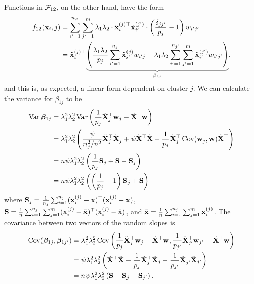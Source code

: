 Functions in ${\mathcal F}_{12}$, on the other hand, have the form
\begin{align*}
  f_{12}(\bx_i, j)
  &= \sum_{i'=1}^{n_{j'}}\sum_{j'=1}^m \lambda_1\lambda_2 \cdot \tilde \bx_i^{(j)\top} \tilde \bx_{i'}^{(j')} \cdot \left( \frac{\delta_{jj'}}{p_j} - 1 \right)  w_{i'j'} \\
  &=  \tilde \bx_i^{(j)\top}   
  {\color{gray}
  \underbrace{\color{black}
  \left( \frac{\lambda_1\lambda_2}{p_j} \sum_{i'=1}^{n_{j}}  \tilde \bx_{i'}^{(j)} w_{i'j} - \lambda_1\lambda_2\sum_{i'=1}^{n_{j'}}\sum_{j'=1}^m  \tilde \bx_{i'}^{(j')}  w_{i'j'} \right)
  }_{\boldsymbol\beta_{1j}}},
\end{align*}
and this is, as expected, a linear form dependent on cluster $j$.
We can calculate the variance for $\beta_{1j}$ to be
\begin{align*}
  \operatorname{Var} \boldsymbol{\beta}_{1j}
  &= \lambda_1^2\lambda_2^2 \operatorname{Var}\left( \frac{1}{p_j} \tilde{{\mathbf X}}_j^\top {\mathbf w}_j - \tilde{{\mathbf X}}^\top {\mathbf w} \right) \\
  &= \lambda_1^2\lambda_2^2 \left( \frac{\psi}{n_j^2/n^2} \tilde{{\mathbf X}}_j^\top\tilde{{\mathbf X}}_j + \psi \tilde{{\mathbf X}}^\top  \tilde{{\mathbf X}} - \frac{1}{p_j} \tilde{{\mathbf X}}_j^\top \operatorname{Cov}( {\mathbf w}_j,{\mathbf w}) \tilde{{\mathbf X}}^\top  \right) \\
  &= n\psi\lambda_1^2\lambda_2^2 \left( \frac{1}{p_j}{\mathbf S}_j +  {\mathbf S} - {\mathbf S}_{j} \right) \\
  &= n\psi\lambda_1^2\lambda_2^2 \left( \left(\frac{1}{p_j}-1\right){\mathbf S}_j +  {\mathbf S}  \right)
\end{align*}
where ${\mathbf S}_j = \frac{1}{n_j} \sum_{i=1}^{n_j} ({\mathbf x}_i^{(j)} - \bar {{\mathbf x}})^\top({\mathbf x}_i^{(j)} - \bar {{\mathbf x}})$, ${\mathbf S} = \frac{1}{n} \sum_{i=1}^{n_j} \sum_{j=1}^{m} ({\mathbf x}_i^{(j)} -  \bar {{\mathbf x}})^\top({\mathbf x}_i^{(j)} - \bar {{\mathbf x}})$, and $\bar {{\mathbf x}} = \frac{1}{n} \sum_{i=1}^{n_j} \sum_{j=1}^{m} {\mathbf x}_i^{(j)}$.
The covariance between two vectors of the random slopes is
\begin{align*}
  \operatorname{Cov}(\boldsymbol{\beta}_{1j},\boldsymbol{\beta}_{1j'}) 
  &= \lambda_1^2\lambda_2^2  \operatorname{Cov} \left( \frac{1}{p_j} \tilde{{\mathbf X}}_j^\top {\mathbf w}_j - \tilde{{\mathbf X}}^\top {\mathbf w}, \frac{1}{p_{j'}} \tilde{{\mathbf X}}_{j'}^\top {\mathbf w}_{j'} - \tilde{{\mathbf X}}^\top {\mathbf w}  \right) \\
  &= \psi\lambda_1^2\lambda_2^2 \left( \tilde{{\mathbf X}}^\top\tilde{{\mathbf X}} - \frac{1}{p_j}\tilde{{\mathbf X}}_j^\top\tilde{{\mathbf X}}_j  - \frac{1}{p_{j'}}\tilde{{\mathbf X}}_{j'}^\top\tilde{{\mathbf X}}_{j'} \right) \\
  &= n\psi\lambda_1^2\lambda_2^2 \left( {\mathbf S} - {\mathbf S}_j - {\mathbf S}_{j'}  \right).
\end{align*}

